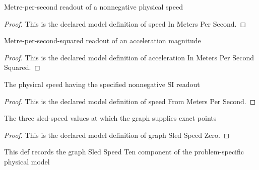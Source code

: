 \begin{definition}
  \label{def:physics:phyx-mini-0749:phyxminiproblems-problemphyxmini0749-speedinmeterspersecond}
  Metre-per-second readout of a nonnegative physical speed
\end{definition}
\begin{proof}
  This is the declared model definition of speed In Meters Per Second.
\end{proof}
\begin{definition}
  \label{def:physics:phyx-mini-0749:phyxminiproblems-problemphyxmini0749-accelerationinmeterspersecondsquared}
  Metre-per-second-squared readout of an acceleration magnitude
\end{definition}
\begin{proof}
  This is the declared model definition of acceleration In Meters Per Second Squared.
\end{proof}
\begin{definition}
  \label{def:physics:phyx-mini-0749:phyxminiproblems-problemphyxmini0749-speedfrommeterspersecond}
  The physical speed having the specified nonnegative SI readout
\end{definition}
\begin{proof}
  This is the declared model definition of speed From Meters Per Second.
\end{proof}
\begin{definition}
  \label{def:physics:phyx-mini-0749:phyxminiproblems-problemphyxmini0749-graphsledspeedzero}
  The three sled-speed values at which the graph supplies exact points
\end{definition}
\begin{proof}
  This is the declared model definition of graph Sled Speed Zero.
\end{proof}
\begin{definition}
  \label{def:physics:phyx-mini-0749:phyxminiproblems-problemphyxmini0749-graphsledspeedten}
  This def records the graph Sled Speed Ten component of the problem-specific physical model
\end{definition}

